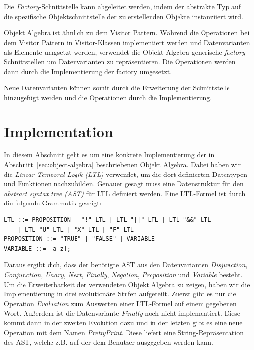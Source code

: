 \documentclass{llncs}
\begin{document}
Die \textit{Factory}-Schnittstelle kann abgeleitet werden, indem der abstrakte Typ auf die spezifische Objektschnittstelle der zu erstellenden Objekte instanziiert wird.

Objekt Algebra ist ähnlich zu dem Visitor Pattern. Während die Operationen bei dem Visitor Pattern in Visitor-Klassen implementiert werden und Datenvarianten als Elemente umgsetzt werden, verwendet die Objekt Algebra generische \textit{factory}-Schnittstellen um Datenvarianten zu repräsentieren. Die Operationen werden dann durch die Implementierung der factory umgesetzt.

Neue Datenvarianten können somit durch die Erweiterung der Schnittstelle hinzugefügt werden und die Operationen durch die Implementierung.


\section{Implementation} \label{sec:implementation}
In diesem Abschnitt geht es um eine konkrete Implementierung der in Abschnitt~\ref{sec:object-algebra} beschriebenen Objekt Algebra.
Dabei haben wir die \emph{Linear Temporal Logik (LTL)} \cite{pnueli77} verwendet, um die dort definierten Datentypen und Funktionen nachzubilden.
Genauer gesagt muss eine Datenstruktur für den \emph{abstract syntax tree (AST)} für LTL definiert werden.
Eine LTL-Formel ist durch die folgende Grammatik gezeigt:

\begin{lstlisting}
LTL ::= PROPOSITION | "!" LTL | LTL "||" LTL | LTL "&&" LTL
	| LTL "U" LTL | "X" LTL | "F" LTL
PROPOSITION ::= "TRUE" | "FALSE" | VARIABLE
VARIABLE ::= [a-z];
\end{lstlisting}\label{lst:grammar}

Daraus ergibt dich, dass der benötigte AST aus den Datenvarianten \emph{Disjunction}, \emph{Conjunction}, \emph{Unary}, \emph{Next}, \emph{Finally}, \emph{Negation}, \emph{Proposition} und \emph{Variable} besteht.
Um die Erweiterbarkeit der verwendeten Objekt Algebra zu zeigen, haben wir die Implementierung in drei evolutionäre Stufen aufgeteilt.
Zuerst gibt es nur die Operation \emph{Evaluation} zum Auswerten einer LTL-Formel auf einem gegebenen Wort. Außerdem ist die Datenvariante \emph{Finally} noch nicht implementiert.
Diese kommt dann in der zweiten Evolution dazu und in der letzten gibt es eine neue Operation mit dem Namen \emph{PrettyPrint}.
Diese liefert eine String-Repräsentation des AST, welche z.B. auf der dem Benutzer ausgegeben werden kann.
\end{document}

